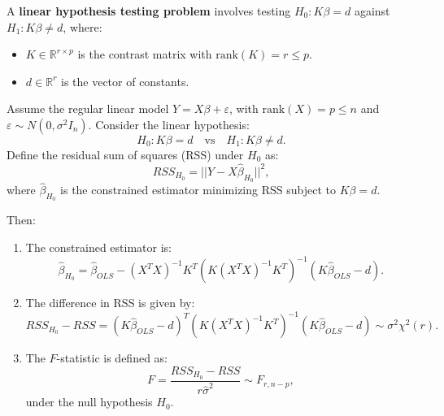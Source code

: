 \documentclass[open=any, 11pt,paper=A4]{scrreprt}
\begin{document}
\begin{definition}
A \textbf{linear hypothesis testing problem} involves testing \(H_0: K\beta = d\) against \(H_1: K\beta \neq d\), where:
\begin{itemize}
    \item \(K \in \mathbb{R}^{r \times p}\) is the contrast matrix with \(\text{rank}(K) = r \le p\).
    \item \(d \in \mathbb{R}^r\) is the vector of constants.
\end{itemize}
\end{definition}

\begin{theorem}
Assume the regular linear model \(Y = X\beta + \varepsilon\), with \(\text{rank}(X) = p \le n\) and \(\varepsilon \sim N(0, \sigma^2 I_n)\). Consider the linear hypothesis:
\[
H_0: K\beta = d \quad \text{vs} \quad H_1: K\beta \neq d.
\]
Define the residual sum of squares (RSS) under \(H_0\) as:
\[
RSS_{H_0} = ||Y - X\hat{\beta}_{H_0}||^2,
\]
where \(\hat{\beta}_{H_0}\) is the constrained estimator minimizing RSS subject to \(K\beta = d\).

Then:
\begin{enumerate}
    \item 
    The constrained estimator is:
    \[
    \hat{\beta}_{H_0} = \hat{\beta}_{OLS} - (X^TX)^{-1} K^T (K (X^TX)^{-1} K^T)^{-1} (K \hat{\beta}_{OLS} - d).
    \]
    
    \item 
    The difference in RSS is given by:
    \[
    RSS_{H_0} - RSS = (K \hat{\beta}_{OLS} - d)^T (K (X^TX)^{-1} K^T)^{-1} (K \hat{\beta}_{OLS} - d) \sim \sigma^2 \chi^2(r).
    \]
    
    \item 
    The \(F\)-statistic is defined as:
    \[
    F = \frac{RSS_{H_0} - RSS}{r \hat{\sigma}^2} \sim F_{r, n - p},
    \]
    under the null hypothesis \(H_0\).
\end{enumerate}
\end{theorem}
\end{document}
